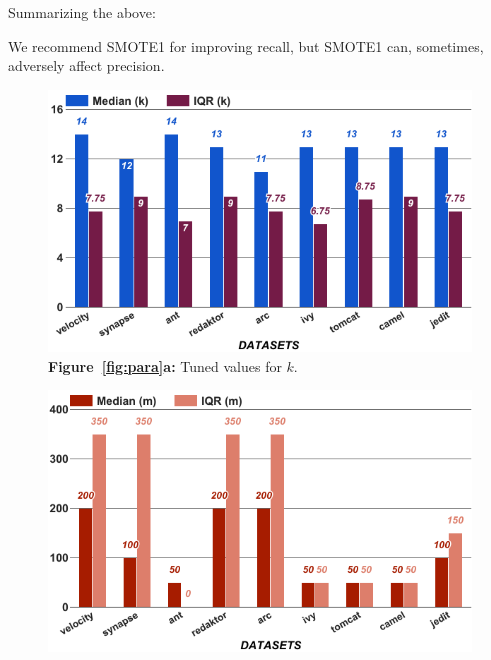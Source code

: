 
\noindent
Summarizing the above:
\begin{lesson1}
We recommend SMOTE1 for improving recall, but SMOTE1 can,
sometimes, adversely affect
precision.
\end{lesson1}

\begin{figure}[!htbp]
    \centering
    \begin{minipage}{.33\textwidth}
    \centering
        \includegraphics[width=.95\linewidth]{./fig/k.png}
        {\bf Figure~\ref{fig:para}a:} Tuned values for $k$.
    \end{minipage}%
    \begin{minipage}{.33\textwidth}
    \centering
        \includegraphics[width=.95\linewidth]{./fig/m.png}

\end{minipage}
\end{figure}
